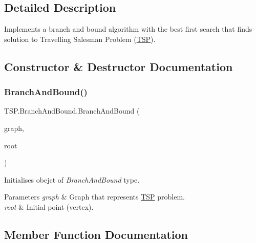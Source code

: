 \subsection{Detailed Description}
Implements a branch and bound algorithm with the best first search that finds solution to Travelling Salesman Problem (\hyperlink{namespace_t_s_p}{T\+SP}). 



\subsection{Constructor \& Destructor Documentation}
\mbox{\label{class_t_s_p_1_1_branch_and_bound_a84b9a838cc94e09944800997fc8e9603}} 
\subsubsection{\texorpdfstring{Branch\+And\+Bound()}{BranchAndBound()}}
{\footnotesize\ttfamily T\+S\+P.\+Branch\+And\+Bound.\+Branch\+And\+Bound (\begin{DoxyParamCaption}\item[{Graph}]{graph,  }\item[{string}]{root }\end{DoxyParamCaption})\hspace{0.3cm}{\ttfamily [inline]}}



Initialises obejct of {\itshape Branch\+And\+Bound}  type. 


\begin{DoxyParams}{Parameters}
{\em graph} & Graph that represents \hyperlink{namespace_t_s_p}{T\+SP} problem.\\
\hline
{\em root} & Initial point (vertex).\\
\hline
\end{DoxyParams}


\subsection{Member Function Documentation}
\mbox{\label{class_t_s_p_1_1_branch_and_bound_a481cf0409bad1731787b1bf60b2186b6}} 
